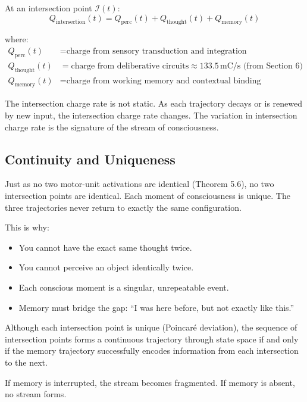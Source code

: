 \begin{definition}
At an intersection point $\mathcal{I}(t)$:
\begin{equation}
Q_{\text{intersection}}(t) = Q_{\text{perc}}(t) + Q_{\text{thought}}(t) + Q_{\text{memory}}(t)
\end{equation}

where:
\begin{align}
Q_{\text{perc}}(t) &= \text{charge from sensory transduction and integration} \\
Q_{\text{thought}}(t) &= \text{charge from deliberative circuits} \approx 133.5\,\text{mC/s (from Section 6)} \\
Q_{\text{memory}}(t) &= \text{charge from working memory and contextual binding}
\end{align}
\end{definition}

The intersection charge rate is not static. As each trajectory decays or is renewed by new input, the intersection charge rate changes. The variation in intersection charge rate is the signature of the stream of consciousness.

\subsection{Continuity and Uniqueness}

\begin{proposition}
Just as no two motor-unit activations are identical (Theorem 5.6), no two intersection points are identical. Each moment of consciousness is unique. The three trajectories never return to exactly the same configuration.

This is why:
\begin{itemize}
\item You cannot have the exact same thought twice.
\item You cannot perceive an object identically twice.
\item Each conscious moment is a singular, unrepeatable event.
\item Memory must bridge the gap: ``I was here before, but not exactly like this.''
\end{itemize}
\end{proposition}

\begin{proposition}
Although each intersection point is unique (Poincaré deviation), the sequence of intersection points forms a continuous trajectory through state space if and only if the memory trajectory successfully encodes information from each intersection to the next.

If memory is interrupted, the stream becomes fragmented. If memory is absent, no stream forms.
\end{proposition}

